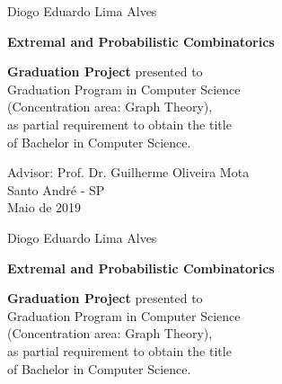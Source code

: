 \documentclass[12pt,twoside,a4paper]{book}
\numberwithin{equation}{section}
\theoremstyle{remark}
\begin{document}
\newpage
\begin{center}
Diogo Eduardo Lima Alves
\end{center}
   \begin{center}
        \vspace*{4 cm}
        \textbf{\Large{Extremal and Probabilistic Combinatorics}}\\
        \vspace*{5cm}
    \end{center}

    \begin{flushright}
{\bf Graduation Project} presented to\\ 
Graduation Program in Computer Science\\ 
(Concentration area: Graph Theory),\\ 
as partial requirement to obtain the title\\ 
of Bachelor in Computer Science.
    \end{flushright}

\vspace{3cm}
\begin{center}
Advisor: Prof. Dr. Guilherme Oliveira Mota\\
\vfill
Santo André - SP\\
Maio de 2019
\end{center}

\pagebreak

\begin{center}
Diogo Eduardo Lima Alves
\end{center}
    
   \begin{center}
        \vspace*{2 cm}
        \textbf{\Large{Extremal and Probabilistic Combinatorics}}\\
        \vspace*{2.5cm}
    \end{center}


    \begin{flushright}
{\bf Graduation Project} presented to\\ 
Graduation Program in Computer Science\\ 
(Concentration area: Graph Theory),\\ 
as partial requirement to obtain the title\\ 
of Bachelor in Computer Science.
    \end{flushright}
    
\end{document}
